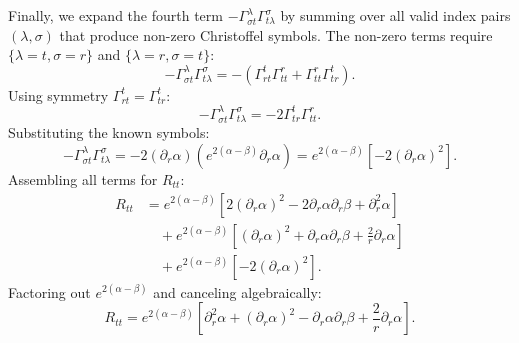 \documentclass[11pt, a4paper]{report}
\begin{document}
Finally, we expand the fourth term $-\Gamma^\lambda_{\sigma t} \Gamma^\sigma_{t\lambda}$ by summing over all valid index pairs $(\lambda, \sigma)$ that produce non-zero Christoffel symbols. The non-zero terms require $\{\lambda=t, \sigma=r\}$ and $\{\lambda=r, \sigma=t\}$:
\begin{equation}
-\Gamma^\lambda_{\sigma t} \Gamma^\sigma_{t\lambda} = -\left( \Gamma^t_{rt} \Gamma^r_{tt} + \Gamma^r_{tt} \Gamma^t_{tr} \right).
\end{equation}
Using symmetry $\Gamma^t_{rt} = \Gamma^t_{tr}$:
\begin{equation}
-\Gamma^\lambda_{\sigma t} \Gamma^\sigma_{t\lambda} = -2 \Gamma^t_{tr} \Gamma^r_{tt}.
\end{equation}
Substituting the known symbols:
\begin{equation}
-\Gamma^\lambda_{\sigma t} \Gamma^\sigma_{t\lambda} = -2 (\partial_r\alpha) \left( e^{2(\alpha-\beta)} \partial_r\alpha \right) = e^{2(\alpha-\beta)} \left[ -2(\partial_r\alpha)^2 \right].
\end{equation}
Assembling all terms for $R_{tt}$:
\begin{align}
R_{tt} &= e^{2(\alpha-\beta)} \left[ 2(\partial_r\alpha)^2 - 2\partial_r\alpha\partial_r\beta + \partial_r^2\alpha \right] \nonumber \\
&\quad + e^{2(\alpha-\beta)} \left[ (\partial_r\alpha)^2 + \partial_r\alpha\partial_r\beta + \frac{2}{r}\partial_r\alpha \right] \nonumber \\
&\quad + e^{2(\alpha-\beta)} \left[ -2(\partial_r\alpha)^2 \right].
\end{align}
Factoring out $e^{2(\alpha-\beta)}$ and canceling algebraically:
\begin{equation}
R_{tt} = e^{2(\alpha-\beta)} \left[ \partial_r^2\alpha + (\partial_r\alpha)^2 - \partial_r\alpha\partial_r\beta + \frac{2}{r}\partial_r\alpha \right].
\end{equation}
\end{document}

